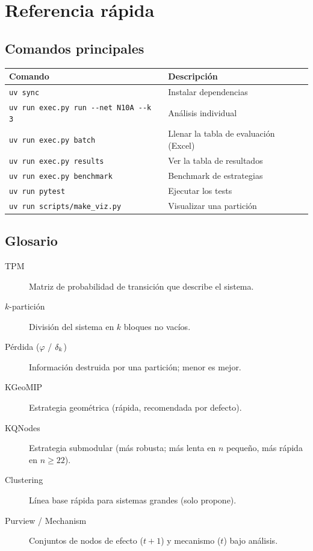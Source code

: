 \documentclass[11pt,letterpaper]{article}
\begin{document}
\section{Referencia rápida}

\subsection{Comandos principales}
\begin{table}[H]
	\centering\small
	\begin{tabular}{@{}ll@{}}
		\toprule
		Comando                                          & Descripción                           \\
		\midrule
		\texttt{uv sync}                                 & Instalar dependencias                 \\
		\texttt{uv run exec.py run -{}-net N10A -{}-k 3} & Análisis individual                   \\
		\texttt{uv run exec.py batch}                    & Llenar la tabla de evaluación (Excel) \\
		\texttt{uv run exec.py results}                  & Ver la tabla de resultados            \\
		\texttt{uv run exec.py benchmark}                & Benchmark de estrategias              \\
		\texttt{uv run pytest}                           & Ejecutar los tests                    \\
		\texttt{uv run scripts/make\_viz.py}             & Visualizar una partición              \\
		\bottomrule
	\end{tabular}
\end{table}

\subsection{Glosario}
\begin{description}
	\item[TPM] Matriz de probabilidad de transición que describe el sistema.
	\item[$k$-partición] División del sistema en $k$ bloques no vacíos.
	\item[Pérdida ($\varphi$ / $\delta_k$)] Información destruida por una partición; menor
	      es mejor.
	\item[KGeoMIP] Estrategia geométrica (rápida, recomendada por defecto).
	\item[KQNodes] Estrategia submodular (más robusta; más lenta en $n$ pequeño, más
	      rápida en $n\ge 22$).
	\item[Clustering] Línea base rápida para sistemas grandes (solo propone).
	\item[Purview / Mechanism] Conjuntos de nodos de efecto ($t{+}1$) y mecanismo
	      ($t$) bajo análisis.
\end{description}
\end{document}
